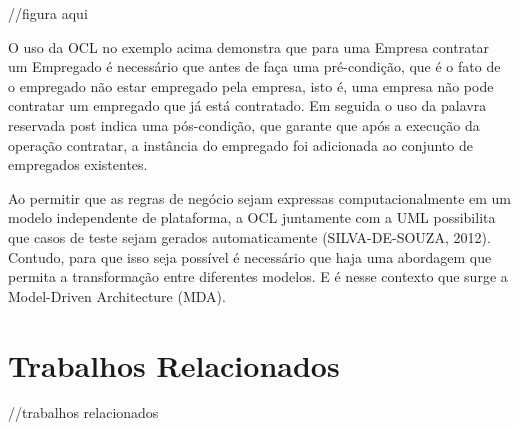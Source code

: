 //figura aqui

O uso da OCL no exemplo acima demonstra que para uma Empresa contratar um Empregado é necessário que antes de faça uma pré-condição, que é o fato de o empregado não estar empregado pela empresa, isto é, uma empresa não pode contratar um empregado que já está contratado. Em seguida o uso da palavra reservada post indica uma pós-condição, que garante que após a execução da operação contratar, a instância do empregado foi adicionada ao conjunto de empregados existentes.


Ao permitir que as regras de negócio sejam expressas computacionalmente em um modelo independente de plataforma, a OCL juntamente com a UML possibilita que casos de teste sejam gerados automaticamente (SILVA-DE-SOUZA, 2012). Contudo, para que isso seja possível é necessário que haja uma abordagem que permita a transformação entre diferentes modelos. E é nesse contexto que surge a Model-Driven Architecture (MDA).

\section{Trabalhos Relacionados}

//trabalhos relacionados 